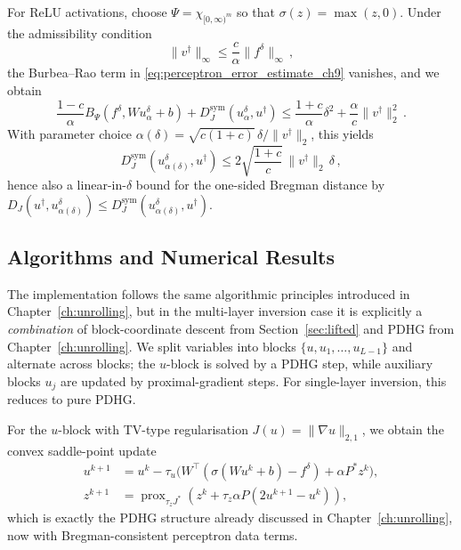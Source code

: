 \begin{exm}\label{exm:relu_perceptron_error_estimate_ch9}\normalfont
For ReLU activations, choose $\Psi=\chi_{[0,\infty)^m}$ so that $\sigma(z)=\max(z,0)$. Under the admissibility condition
\begin{equation*}
    \|v^\dagger\|_\infty \le \frac{c}{\alpha}\|f^\delta\|_\infty \, ,
\end{equation*}
the Burbea--Rao term in \eqref{eq:perceptron_error_estimate_ch9} vanishes, and we obtain
\begin{equation*}
    \frac{1-c}{\alpha}B_\Psi\!\left(f^\delta, Wu_\alpha^\delta+b\right) + D_J^{\mathrm{sym}}(u_\alpha^\delta,u^\dagger)
    \le \frac{1+c}{\alpha}\delta^2 + \frac{\alpha}{c}\|v^\dagger\|_2^2 \, .
\end{equation*}
With parameter choice $\alpha(\delta)=\sqrt{c(1+c)}\,\delta/\|v^\dagger\|_2$, this yields
\begin{equation*}
    D_J^{\mathrm{sym}}\!\left(u_{\alpha(\delta)}^\delta,u^\dagger\right)
    \le 2\sqrt{\frac{1+c}{c}}\,\|v^\dagger\|_2\,\delta \, ,
\end{equation*}
hence also a linear-in-$\delta$ bound for the one-sided Bregman distance by $D_J(u^\dagger,u_{\alpha(\delta)}^\delta)\le D_J^{\mathrm{sym}}(u_{\alpha(\delta)}^\delta,u^\dagger)$.
\end{exm}

\subsection{Algorithms and Numerical Results}
The implementation follows the same algorithmic principles introduced in Chapter~\ref{ch:unrolling}, but in the multi-layer inversion case it is explicitly a \emph{combination} of block-coordinate descent from Section~\ref{sec:lifted} and PDHG from Chapter~\ref{ch:unrolling}. We split variables into blocks $\{u,u_1,\ldots,u_{L-1}\}$ and alternate across blocks; the $u$-block is solved by a PDHG step, while auxiliary blocks $u_j$ are updated by proximal-gradient steps. For single-layer inversion, this reduces to pure PDHG.

For the $u$-block with TV-type regularisation $J(u)=\|\nabla u\|_{2,1}$, we obtain the convex saddle-point update
\begin{align*}
    u^{k+1} &= u^k - \tau_u\Big(W^\top(\sigma(Wu^k+b)-f^\delta)+\alpha P^\ast z^k\Big), \\
    z^{k+1} &= \operatorname{prox}_{\tau_z J^\ast}\!\left(z^k+\tau_z\alpha P(2u^{k+1}-u^k)\right),
\end{align*}
which is exactly the PDHG structure already discussed in Chapter~\ref{ch:unrolling}, now with Bregman-consistent perceptron data terms.

